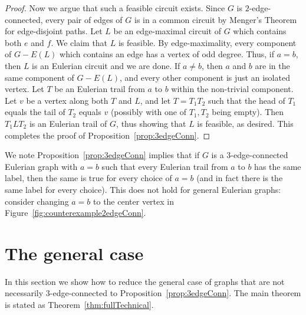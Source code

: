 \documentclass[a4paper, 12pt]{article}
\newcommand{\RMM}[1]{\textcolor{orange}{RM: #1}}
\begin{document}
\begin{proof}
    Now we argue that such a feasible circuit exists. Since $G$ is $2$-edge-connected, every pair of edges of $G$ is in a common circuit by Menger's Theorem for edge-disjoint paths. Let $L$ be an edge-maximal circuit of $G$ which contains both $e$ and $f$. We claim that $L$ is feasible. By edge-maximality, every component of $G-E(L)$ which contains an edge has a vertex of odd degree. Thus, if $a=b$, then $L$ is an Eulerian circuit and we are done. If $a \neq b$, then $a$ and $b$ are in the same component of $G-E(L)$, and every other component is just an isolated vertex. Let $T$ be an Eulerian trail from $a$ to $b$ within the non-trivial component. Let $v$ be a vertex along both $T$ and $L$, and let $T = T_1T_2$ such that the head of $T_1$ equals the tail of $T_2$ equals $v$ (possibly with one of $T_1,T_2$ being empty). Then $T_1LT_2$ is an Eulerian trail of $G$, thus showing that $L$ is feasible, as desired. This completes the proof of Proposition~\ref{prop:3edgeConn}.
\end{proof}

We note Proposition~\ref{prop:3edgeConn} implies that if $G$ is a 3-edge-connected Eulerian graph with $a=b$ such that every Eulerian trail from $a$ to $b$ has the same label, then the same is true for every choice of $a=b$ (and in fact there is the same label for every choice). This does not hold for general Eulerian graphs: consider changing $a=b$ to the center vertex in Figure~\ref{fig:counterexample2edgeConn}.


\section{The general case}
\label{sec:general}

In this section we show how to reduce the general case of graphs that are not necessarily $3$-edge-connected to Proposition~\ref{prop:3edgeConn}. The main theorem is stated as Theorem~\ref{thm:fullTechnical}.




\end{document}
